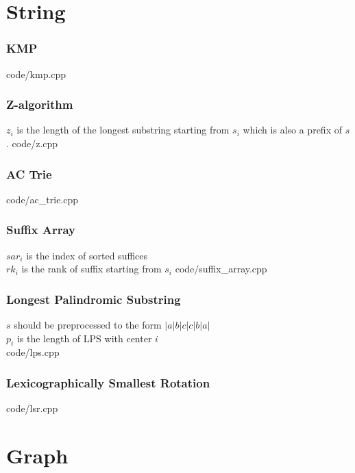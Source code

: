 \documentclass [landscape,8pt,a4paper,twocolumn]{article}
\begin{document}
\newpage
\part{String}

\section{KMP}
 {code/kmp.cpp}

\section{Z-algorithm}
$ z_i $ is the length of the longest substring starting from $ s_i $ which is also a prefix of $ s $.
 {code/z.cpp}
\vfill\null

\section{AC Trie}
 {code/ac_trie.cpp}

\vfill\null

\section{Suffix Array}
$ sar_i $ is the index of sorted suffices \\
$ rk_i $ is the rank of suffix starting from $ s_i $
 {code/suffix_array.cpp}

\vfill\null

\section{Longest Palindromic Substring}
$ s $ should be preprocessed to the form $ |a|b|c|c|b|a| $\\
$ p_i $ is the length of  LPS with center $ i $\\
 {code/lps.cpp}

\section{Lexicographically Smallest Rotation}
 {code/lsr.cpp}

\newpage
\part{Graph}
\end{document}
